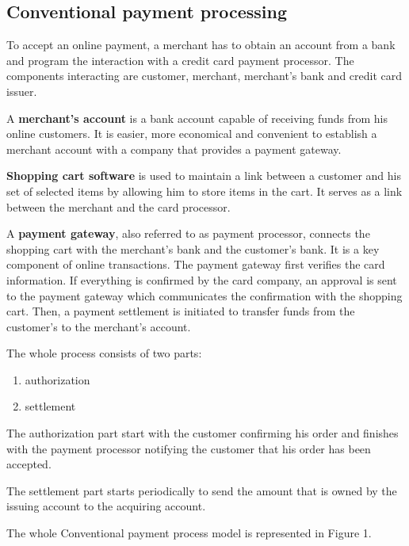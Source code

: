 \documentclass{ferseminar}
\begin{document}
\subsection{Conventional payment processing}
To accept an online payment, a merchant has to obtain an account from a bank and program the interaction with a credit card payment processor. The components interacting are customer, merchant, merchant's bank and credit card issuer.

A \textbf{merchant's account} is a bank account capable of receiving funds from his online customers. It is easier, more economical and convenient to establish a merchant account with a company that provides a payment gateway.

\textbf{Shopping cart software} is used to maintain a link between a customer and his set of selected items by allowing him to store items in the cart. It serves as a link between the merchant and the card processor.

A \textbf{payment gateway}, also referred to as payment processor, connects the shopping cart with the merchant's bank and the customer's bank. It is a key component of online transactions. The payment gateway first verifies the card information. If everything is confirmed by the card company, an approval is sent to the payment gateway which communicates the confirmation with the shopping cart. Then, a payment settlement is initiated to transfer funds from the customer's to the merchant's account. 

The whole process consists of two parts:
\begin{enumerate}
	\item authorization
	\item settlement
\end{enumerate}

The authorization part start with the customer confirming his order and finishes with the payment processor notifying the customer that his order has been accepted.

The settlement part starts periodically to send the amount that is owned by the issuing account to the acquiring account. 

The whole Conventional payment process model is represented in Figure 1.
\end{document}

